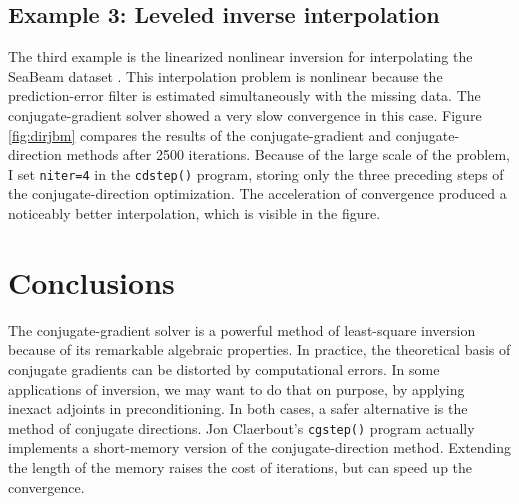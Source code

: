 \subsection{Example 3: Leveled inverse interpolation}
The third example is the linearized nonlinear inversion for
interpolating the SeaBeam dataset
\cite{Claerbout.tdf.82,Crawley.sep.84.279}. This interpolation problem
is nonlinear because the pre\-dic\-tion-error fil\-ter is esti\-mated
simul\-ta\-neously with the missing data. The conjugate-gradient
solver showed a very slow convergence in this case. Figure
\ref{fig:dirjbm} compares the results of the conjugate-gradient and
conjugate-direction methods after 2500 iterations. Because of the
large scale of the problem, I set \verb!niter=4! in the
\verb!cdstep()!  program, storing only the three preceding steps of the
conjugate-direction optimization. The acceleration of convergence
produced a noticeably better interpolation, which is visible in the
figure.

 
\section{Conclusions}

The conjugate-gradient solver is a powerful method of least-square
inversion because of its remarkable algebraic properties. In practice,
the theoretical basis of conjugate gradients can be distorted by
computational errors. In some applications of inversion, we may want
to do that on purpose, by applying inexact adjoints in
preconditioning.  In both cases, a safer alternative is the method of
conjugate directions. Jon Claerbout's \verb!cgstep()! program actually
implements a short-memory version of the conjugate-direction method.
Extending the length of the memory raises the cost of iterations, but
can speed up the convergence.







